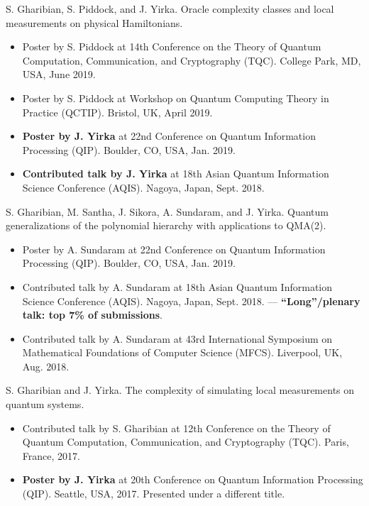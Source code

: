 \documentclass[11pt,letterpaper,serif]{moderncv}
\newcommand{\pubItemSep}{0.3em}
\begin{document}
S. Gharibian, S. Piddock, and J. Yirka. Oracle complexity classes and local measurements on physical Hamiltonians.
\begin{adjustwidth}{.25in}{}
	\begin{itemize}[itemsep=\pubItemSep]
		\item Poster by S. Piddock at 14th Conference on the Theory of Quantum Computation, Communication, and Cryptography (TQC). College Park, MD, USA, June 2019.
		\item Poster by S. Piddock at Workshop on Quantum Computing Theory in Practice (QCTIP). Bristol, UK, April 2019.
		\item \textbf{Poster by J. Yirka} at 22nd Conference on Quantum Information Processing (QIP). Boulder, CO, USA, Jan. 2019.
		\item \textbf{Contributed talk by J. Yirka} at 18th Asian Quantum Information Science Conference (AQIS). Nagoya, Japan, Sept. 2018.
	\end{itemize}
\end{adjustwidth}

S. Gharibian, M. Santha, J. Sikora, A. Sundaram, and J. Yirka. Quantum generalizations of the polynomial hierarchy with applications to QMA(2).
\begin{adjustwidth}{.25in}{} 
	\begin{itemize}[itemsep=\pubItemSep]
		\item Poster by A. Sundaram at 22nd Conference on Quantum Information Processing (QIP). Boulder, CO, USA, Jan. 2019.
		\item Contributed talk by A. Sundaram at 18th Asian Quantum Information Science Conference (AQIS). Nagoya, Japan, Sept. 2018. --- \textbf{``Long''/plenary talk: top 7\% of submissions}.
		\item Contributed talk by A. Sundaram at 43rd International	Symposium on Mathematical Foundations of Computer Science (MFCS). Liverpool, UK, Aug. 2018.
	\end{itemize}
\end{adjustwidth}

S. Gharibian and J. Yirka. The complexity of simulating local measurements on quantum systems.
\begin{adjustwidth}{.25in}{}
	\begin{itemize}[itemsep=\pubItemSep]
		\item Contributed talk by S. Gharibian at 12th Conference on the Theory of Quantum Computation, Communication,
		and Cryptography (TQC). Paris, France, 2017.
		\item \textbf{Poster by J. Yirka} at 20th Conference on Quantum Information Processing (QIP). Seattle, USA, 2017. Presented under a different title.
	\end{itemize}
\end{adjustwidth}
\end{document}
